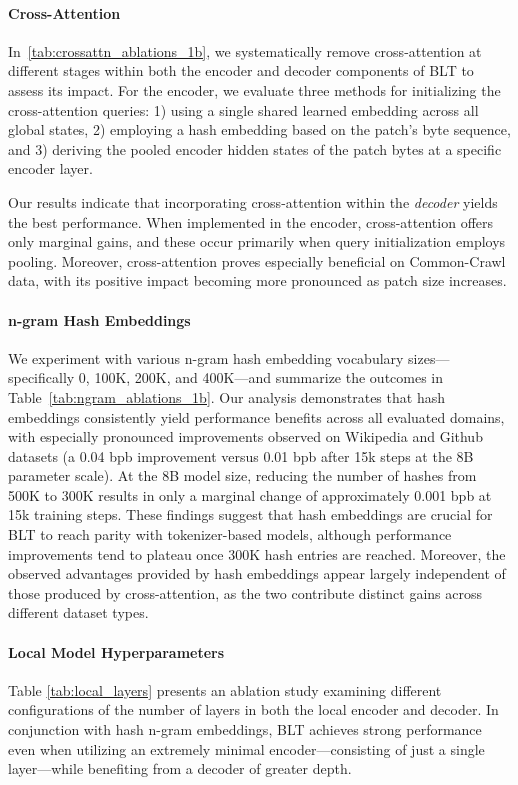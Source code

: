\paragraph{Cross-Attention} 
In~\autoref{tab:crossattn_ablations_1b}, we systematically remove cross-attention at different stages within both the encoder and decoder components of {\textsc BLT} to assess its impact. For the encoder, we evaluate three methods for initializing the cross-attention queries: 1) using a single shared learned embedding across all global states, 2) employing a hash embedding based on the patch's byte sequence, and 3) deriving the pooled encoder hidden states of the patch bytes at a specific encoder layer.

Our results indicate that incorporating cross-attention within the \textit{decoder} yields the best performance. When implemented in the encoder, cross-attention offers only marginal gains, and these occur primarily when query initialization employs pooling. Moreover, cross-attention proves especially beneficial on Common-Crawl data, with its positive impact becoming more pronounced as patch size increases.

\paragraph{n-gram Hash Embeddings} 

We experiment with various n-gram hash embedding vocabulary sizes—specifically 0, 100K, 200K, and 400K—and summarize the outcomes in Table~\ref{tab:ngram_ablations_1b}. Our analysis demonstrates that hash embeddings consistently yield performance benefits across all evaluated domains, with especially pronounced improvements observed on Wikipedia and Github datasets (a 0.04 bpb improvement versus 0.01 bpb after 15k steps at the 8B parameter scale). At the 8B model size, reducing the number of hashes from 500K to 300K results in only a marginal change of approximately 0.001 bpb at 15k training steps. These findings suggest that hash embeddings are crucial for {\textsc BLT} to reach parity with tokenizer-based models, although performance improvements tend to plateau once 300K hash entries are reached. Moreover, the observed advantages provided by hash embeddings appear largely independent of those produced by cross-attention, as the two contribute distinct gains across different dataset types.

\paragraph{Local Model Hyperparameters} Table \ref{tab:local_layers} presents an ablation study examining different configurations of the number of layers in both the local encoder and decoder. In conjunction with hash n-gram embeddings, {\textsc BLT} achieves strong performance even when utilizing an extremely minimal encoder—consisting of just a single layer—while benefiting from a decoder of greater depth.

